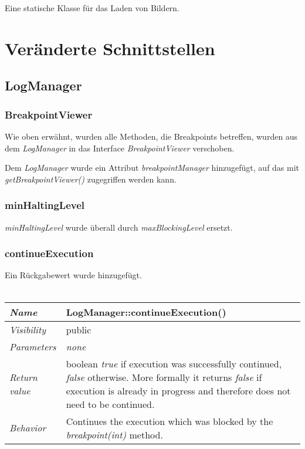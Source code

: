 \documentclass[a4paper]{report}
\begin{document}
Eine statische Klasse für das Laden von Bildern.

\section{Veränderte Schnittstellen}

\subsection{LogManager}

\subsubsection{BreakpointViewer}

Wie oben erwähnt, wurden alle Methoden, die Breakpoints betreffen, wurden aus dem \emph{LogManager} in das Interface \emph{BreakpointViewer} verschoben.

Dem \emph{LogManager} wurde ein Attribut \emph{breakpointManager} hinzugefügt, auf das mit \emph{getBreakpointViewer()} zugegriffen werden kann.

\subsubsection{minHaltingLevel}

\emph{minHaltingLevel} wurde überall durch \emph{maxBlockingLevel} ersetzt.

\renewcommand{\arraystretch}{1.5}
\subsubsection{continueExecution}

Ein Rückgabewert wurde hinzugefügt.\\\\
\begin{tabular}{p{2.3cm}  p{11.5cm}}
  \hline
 \textit{Name} & LogManager::continueExecution()\\
  \hline
 \textit{Visibility} & public\\
  \hline
 \textit{Parameters} & \textit{none}\\
  \hline
 \textit{Return value} & boolean \emph{true} if execution was successfully continued, \emph{false} otherwise. More formally it returns \emph{false} if execution is already in progress and therefore does not need to be continued.\\
  \hline
 \textit{Behavior} & Continues the execution which was blocked by the \emph{breakpoint(int)} method.\\
  \hline
\end{tabular}
\renewcommand{\arraystretch}{1}
\end{document}
